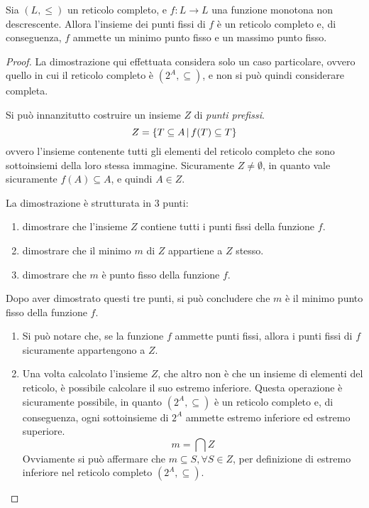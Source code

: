 \begin{thm}
    Sia $(L, \le)$ un reticolo completo, e $f: L \rightarrow L$ una funzione
    monotona non descrescente. Allora l'insieme dei punti fissi di $f$ è un reticolo completo
    e, di conseguenza, $f$ ammette un minimo punto fisso e un massimo punto
    fisso.

    \begin{proof}
        La dimostrazione qui effettuata considera solo un caso particolare,
        ovvero quello in cui il reticolo completo è $(2^A, \subseteq)$,
        e non si può quindi considerare completa.

        Si può innanzitutto costruire un insieme $Z$ di \textit{punti prefissi}.
        \[
            Z = \left\{T \subseteq A \, | \, f(T) \subseteq T\right\}
        \]
        ovvero l'insieme contenente tutti gli elementi del reticolo completo
        che sono sottoinsiemi della loro stessa immagine.
        Sicuramente $Z \neq \emptyset$, in quanto vale sicuramente
        $f(A) \subseteq A$, e quindi $A \in Z$.

        La dimostrazione è strutturata in 3 punti:
        \begin{enumerate}
            \item dimostrare che l'insieme $Z$ contiene tutti i punti
            fissi della funzione $f$.
            \item dimostrare che il minimo $m$ di $Z$ appartiene a $Z$ stesso.
            \item dimostrare che $m$ è punto fisso della funzione $f$.
        \end{enumerate}
        Dopo aver dimostrato questi tre punti, si può concludere che
        $m$ è il minimo punto fisso della funzione $f$.

        \begin{enumerate}
            \item Si può notare che, se la funzione $f$ ammette punti fissi,
            allora i punti fissi di $f$ sicuramente appartengono a $Z$.
            \item Una volta calcolato l'insieme $Z$, che altro non è che un
            insieme di elementi del reticolo, è possibile calcolare
            il suo estremo inferiore. Questa operazione è sicuramente possibile,
            in quanto $(2^A, \subseteq)$ è un reticolo completo e, di conseguenza,
            ogni sottoinsieme di $2^A$ ammette estremo inferiore ed estremo superiore.\\
            \[
                m = \bigcap Z
            \]
            Ovviamente si può affermare che $m \subseteq S, \forall S \in Z$, per
            definizione di estremo inferiore nel reticolo completo $(2^A, \subseteq)$.


\end{enumerate}
\end{proof}
\end{thm}
